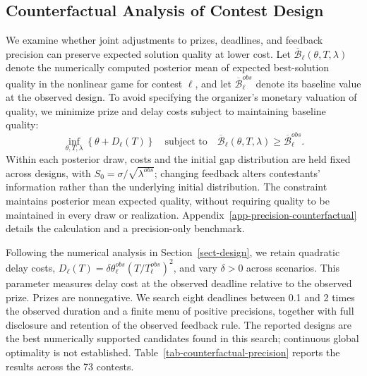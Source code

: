 \documentclass[mnsc]{informs3}
\begin{document}
\subsection{Counterfactual Analysis of Contest Design}\label{sect-precision-design}

We examine whether joint adjustments to prizes, deadlines, and feedback precision can preserve expected solution quality at lower cost. Let $\overline{\mathcal B}_\ell(\theta,T,\lambda)$ denote the numerically computed posterior mean of expected best-solution quality in the nonlinear game for contest $\ell$, and let $\overline{\mathcal B}^{obs}_\ell$ denote its baseline value at the observed design. To avoid specifying the organizer's monetary valuation of quality, we minimize prize and delay costs subject to maintaining baseline quality:
\begin{equation}\label{eq-empirical-joint-design}
\inf_{\theta,T,\lambda}\left\{\theta+D_\ell(T)\right\}
\quad\text{subject to}\quad
\overline{\mathcal B}_\ell(\theta,T,\lambda)\geq \overline{\mathcal B}^{obs}_\ell.
\end{equation}
Within each posterior draw, costs and the initial gap distribution are held fixed across designs, with $S_0=\sigma/\sqrt{\lambda^{obs}}$; changing feedback alters contestants' information rather than the underlying initial distribution. The constraint maintains posterior mean expected quality, without requiring quality to be maintained in every draw or realization. Appendix~\ref{app-precision-counterfactual} details the calculation and a precision-only benchmark.

Following the numerical analysis in Section~\ref{sect-design}, we retain quadratic delay costs, $D_\ell(T)=\delta\theta_\ell^{obs}(T/T_\ell^{obs})^2$, and vary $\delta>0$ across scenarios. This parameter measures delay cost at the observed deadline relative to the observed prize. Prizes are nonnegative. We search eight deadlines between 0.1 and 2 times the observed duration and a finite menu of positive precisions, together with full disclosure and retention of the observed feedback rule. The reported designs are the best numerically supported candidates found in this search; continuous global optimality is not established. Table~\ref{tab-counterfactual-precision} reports the results across the 73 contests.
\end{document}
